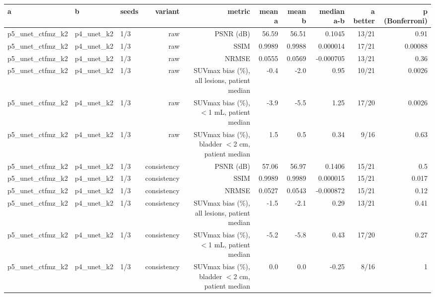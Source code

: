 \begin{tabular}{lllrrrrrrr}
\toprule
a & b & seeds & variant & metric & mean a & mean b & median a-b & a better & p (Bonferroni) \\
\midrule
p5\_unet\_ctfmz\_k2 & p4\_unet\_k2 & 1/3 & raw & PSNR (dB) & 56.59 & 56.51 & 0.1045 & 13/21 & 0.91 \\
p5\_unet\_ctfmz\_k2 & p4\_unet\_k2 & 1/3 & raw & SSIM & 0.9989 & 0.9988 & 0.000014 & 17/21 & 0.00088 \\
p5\_unet\_ctfmz\_k2 & p4\_unet\_k2 & 1/3 & raw & NRMSE & 0.0555 & 0.0569 & -0.000705 & 13/21 & 0.36 \\
p5\_unet\_ctfmz\_k2 & p4\_unet\_k2 & 1/3 & raw & SUVmax bias (\%), all lesions, patient median & -0.4 & -2.0 & 0.95 & 10/21 & 0.0026 \\
p5\_unet\_ctfmz\_k2 & p4\_unet\_k2 & 1/3 & raw & SUVmax bias (\%), $<$1 mL, patient median & -3.9 & -5.5 & 1.25 & 17/20 & 0.0026 \\
p5\_unet\_ctfmz\_k2 & p4\_unet\_k2 & 1/3 & raw & SUVmax bias (\%), bladder $<$2 cm, patient median & 1.5 & 0.5 & 0.34 & 9/16 & 0.63 \\
p5\_unet\_ctfmz\_k2 & p4\_unet\_k2 & 1/3 & consistency & PSNR (dB) & 57.06 & 56.97 & 0.1406 & 15/21 & 0.5 \\
p5\_unet\_ctfmz\_k2 & p4\_unet\_k2 & 1/3 & consistency & SSIM & 0.9989 & 0.9989 & 0.000015 & 15/21 & 0.017 \\
p5\_unet\_ctfmz\_k2 & p4\_unet\_k2 & 1/3 & consistency & NRMSE & 0.0527 & 0.0543 & -0.000872 & 15/21 & 0.12 \\
p5\_unet\_ctfmz\_k2 & p4\_unet\_k2 & 1/3 & consistency & SUVmax bias (\%), all lesions, patient median & -1.5 & -2.1 & 0.29 & 13/21 & 0.41 \\
p5\_unet\_ctfmz\_k2 & p4\_unet\_k2 & 1/3 & consistency & SUVmax bias (\%), $<$1 mL, patient median & -5.2 & -5.8 & 0.43 & 17/20 & 0.27 \\
p5\_unet\_ctfmz\_k2 & p4\_unet\_k2 & 1/3 & consistency & SUVmax bias (\%), bladder $<$2 cm, patient median & 0.0 & 0.0 & -0.25 & 8/16 & 1 \\
\bottomrule
\end{tabular}
